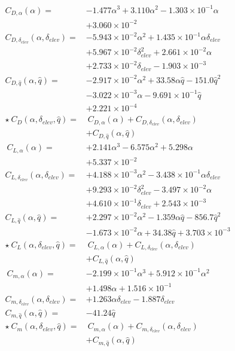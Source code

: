 \documentclass[%
 reprint,
 amsmath,amssymb,
 aps,
]{revtex4-2}
\begin{document}
\begin{align*}
C_{D,\alpha}(\alpha) = &-1.477\alpha^3 + 3.110\alpha^2 - 1.303\times10^{-1}\alpha \\
&+ 3.060\times10^{-2} \\ 
C_{D,\delta_{elev}}(\alpha,\delta_{elev}) = &- 5.943\times10^{-2}\alpha^2 + 1.435\times10^{-1}\alpha\delta_{elev} \\
&+ 5.967\times10^{-2}\delta_{elev}^2 + 2.661\times10^{-2}\alpha \\
&+ 2.733\times10^{-2}\delta_{elev} - 1.903\times10^{-3} \\
C_{D,\hat{q}}(\alpha,\hat{q}) = &- 2.917\times10^{-2}\alpha^2 + 33.58\alpha\hat{q} - 151.0\hat{q}^2 \\
&- 3.022\times10^{-3}\alpha - 9.691\times10^{-1}\hat{q} \\
&+ 2.221\times10^{-4} \\ 
\star\ C_D(\alpha, \delta_{elev}, \hat{q}) = 
        &\ C_{D,\alpha}(\alpha) + C_{D,\delta_{elev}}(\alpha, \delta_{elev}) \tag{21} \\ 
        &+ C_{D,\hat{q}}(\alpha,\hat{q}) \\ 
\
C_{L,\alpha}(\alpha) = &+2.141\alpha^3 - 6.575\alpha^2 + 5.298\alpha \\
&+ 5.337\times10^{-2} \\
C_{L,\delta_{elev}}(\alpha,\delta_{elev}) = &+ 4.188\times10^{-3}\alpha^2 - 3.438\times10^{-1}\alpha\delta_{elev} \\
&+ 9.293\times10^{-2}\delta_{elev}^2 - 3.497\times10^{-2}\alpha  \\
&+ 4.610\times10^{-1}\delta_{elev} + 2.543\times10^{-3} \\
C_{L,\hat{q}}(\alpha,\hat{q}) = &+ 2.297\times10^{-2}\alpha^2 - 1.359\alpha\hat{q} - 856.7\hat{q}^2 \\
&- 1.673\times10^{-2}\alpha + 34.38\hat{q} + 3.703\times10^{-3} \\
\star\ C_L(\alpha, \delta_{elev}, \hat{q}) = 
        &\ C_{L,\alpha}(\alpha) + C_{L,\delta_{elev}}(\alpha, \delta_{elev}) \tag{22} \\ 
        &+ C_{L,\hat{q}}(\alpha,\hat{q}) \\
\
C_{m,\alpha}(\alpha) = &- 2.199\times10^{-1}\alpha^3 + 5.912\times10^{-1}\alpha^2 \\
&+ 1.498\alpha + 1.516\times10^{-1} \\
C_{m,\delta_{elev}}(\alpha,\delta_{elev}) = &+1.263\alpha\delta_{elev} - 1.887\delta_{elev} \\
C_{m,\hat{q}}(\alpha,\hat{q}) = &-41.24\hat{q} \\
\star\ C_m(\alpha, \delta_{elev}, \hat{q}) = 
        &\ C_{m,\alpha}(\alpha) + C_{m,\delta_{elev}}(\alpha, \delta_{elev}) \tag{23} \\ 
        &+ C_{m,\hat{q}}(\alpha,\hat{q}) \\ 
\end{align*}
\end{document}
